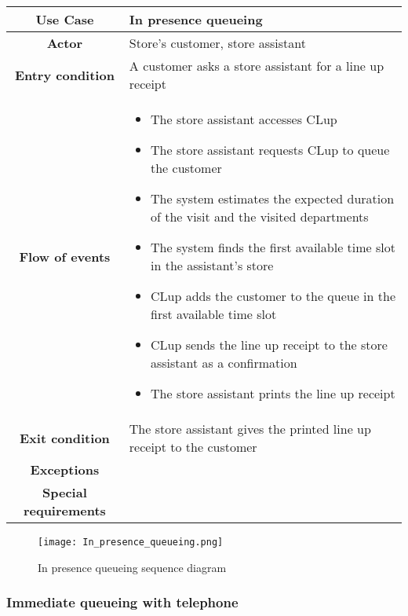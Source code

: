 \documentclass[../../main.tex]{subfiles}
\begin{document}
      \begin{table}[H]
        \centering
          \begin{tabular}{c m{}}
          \hline
          \textbf{Use Case} & In presence queueing\\ \hline
          \textbf{Actor} & Store's customer, store assistant\\ \hline
          \textbf{Entry condition} & A customer asks a store assistant for a line up receipt\\  \hline
          \textbf{Flow of events} & \begin{itemize}
                                      \item The store assistant accesses CLup
                                      \item The store assistant requests CLup to queue the customer
                                      \item The system estimates the expected duration of the visit and the visited departments
                                      \item The system finds the first available time slot in the assistant's store
                                      \item CLup adds the customer to the queue in the first available time slot
                                      \item CLup sends the line up receipt to the store assistant as a confirmation
                                      \item The store assistant prints the line up receipt 
                                    \end{itemize}\\ \hline
          \textbf{Exit condition} & The store assistant gives the printed line up receipt to the customer\\ \hline
          \textbf{Exceptions} & \\ \hline
          \textbf{Special requirements} &\\ \hline
          \end{tabular}
      \end{table}

      \begin{figure}[H]
        \centering
        \texttt{[image: In\_presence\_queueing.png]}
        \caption{In presence queueing sequence diagram}
      \end{figure}


      \subsubsection{Immediate queueing with telephone}
\end{document}
